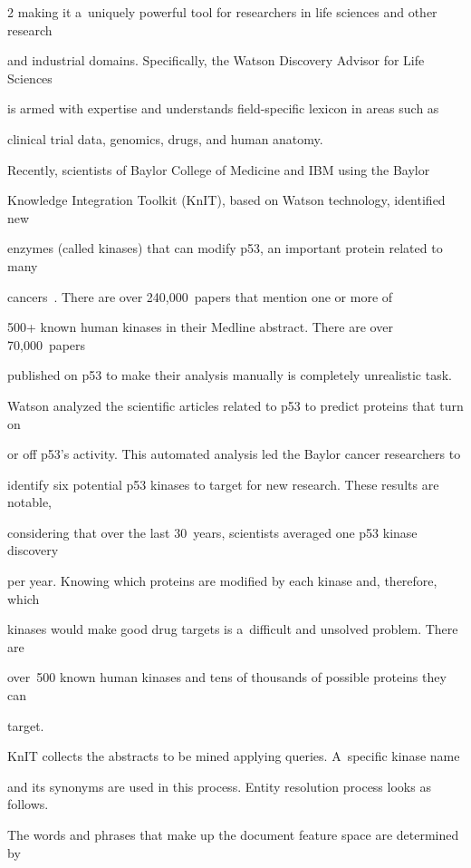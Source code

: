\begin{multicols}{2}
making it a~uniquely powerful tool for researchers in life sciences and other research


and industrial domains.  Specifically, the Watson Discovery Advisor for Life Sciences


is armed with expertise and understands field-specific lexicon in areas such as


clinical trial data, genomics, drugs, and human anatomy.





  Recently, scientists of Baylor College of Medicine and IBM using the Baylor


Knowledge Integration Toolkit (KnIT), based on Watson technology, identified new


enzymes (called kinases) that can modify p53, an important protein related to many


cancers~\cite{77-kl}. There are over 240,000~papers that mention one or more of


500+ known human kinases in their Medline abstract. There are over 70,000~papers


published on p53 to make their analysis manually is completely unrealistic task.


Watson analyzed the scientific articles related to p53 to predict proteins that turn on


or off p53's activity. This automated analysis led the Baylor cancer researchers to


identify six potential p53 kinases to target for new research. These results are notable,


considering that over the last 30~years, scientists averaged one p53 kinase discovery


per year. Knowing which proteins are modified by each kinase and, therefore, which


kinases would make good drug targets is a~difficult and unsolved problem. There are


over~500 known human kinases and tens of thousands of possible proteins they can


target.





  KnIT collects the abstracts to be mined applying queries. A~specific kinase name


and its synonyms are used in this process. Entity resolution process looks as follows.


The words and phrases that make up the document feature space are determined by



\end{multicols}
